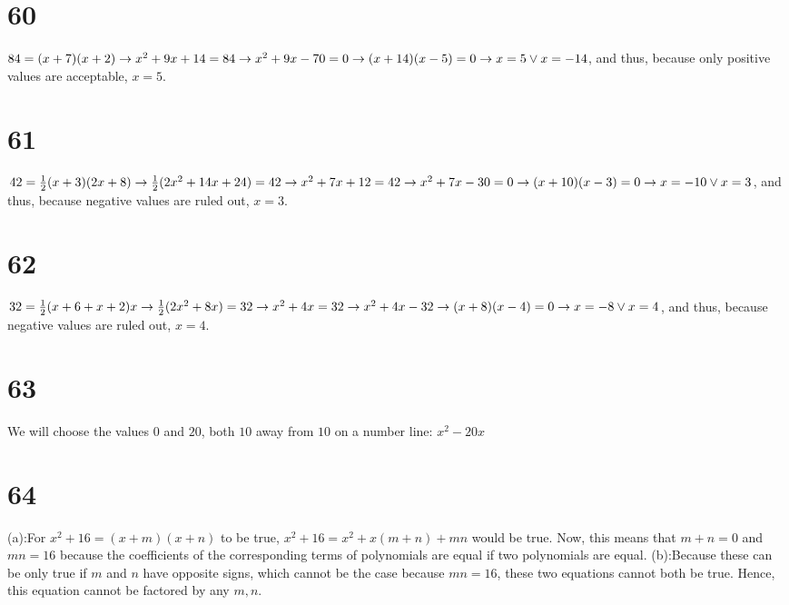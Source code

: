 \documentclass{article}
\theoremstyle{definition}
\begin{document}
\section*{60}
$84=(x+7)(x+2)\newline\rightarrow x^2+9x+14=84\newline\rightarrow x^2+9x-70=0\newline\rightarrow (x+14)(x-5)=0\newline\rightarrow x=5\vee x=-14$, and thus, 
because only positive values are acceptable, $x=5$.

\section*{61}
$42=\frac{1}{2}(x+3)(2x+8)\newline\rightarrow \frac{1}{2}(2x^2+14x+24)=42\newline\rightarrow x^2+7x+12=42\newline\rightarrow
x^2+7x-30=0\newline\rightarrow (x+10)(x-3)=0\newline\rightarrow x=-10\vee x=3$, and thus, because negative values are ruled out, $x=3$. 

\section*{62}
$32=\frac{1}{2}(x+6+x+2)x\newline\rightarrow \frac{1}{2}(2x^2+8x)=32\newline\rightarrow x^2+4x=32\newline\rightarrow x^2+4x-32\newline\rightarrow 
(x+8)(x-4)=0\newline\rightarrow x=-8\vee x=4$, and thus, because negative values are ruled out, $x=4$.

\section*{63}
We will choose the values $0$ and $20$, both $10$ away from $10$ on a number line:
$x^2-20x$

\section*{64}
(a):\newline For $x^2+16=(x+m)(x+n)$ to be true, $x^2+16=x^2+x(m+n)+mn$ would be true. Now, this means that $m+n=0$ and $mn=16$ because the coefficients 
of the corresponding terms of polynomials are equal if two polynomials are equal.\newline 
(b):Because these can be only true if $m$ and $n$ have opposite signs, which 
cannot be the case because $mn=16$, these two equations cannot both be true. Hence, this equation cannot be factored by any $m,n$. 
\end{document}
